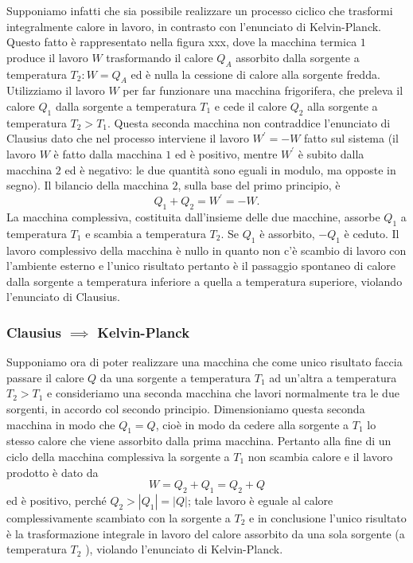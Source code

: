 \documentclass[class=book, crop=false, oneside, 12pt]{standalone}
\begin{document}
Supponiamo infatti che sia possibile realizzare un processo ciclico che trasformi integralmente calore in lavoro, in contrasto con l'enunciato di Kelvin-Planck. 
Questo fatto è rappresentato nella figura xxx, dove la macchina termica \(1\) produce il lavoro \(W\) trasformando il calore \(Q_A\) assorbito dalla sorgente a temperatura \(T_2 : W = Q_A\) ed è nulla la cessione di calore alla sorgente fredda. 
Utilizziamo il lavoro \(W\) per far funzionare una macchina frigorifera, che preleva il calore \(Q_1\) dalla sorgente a temperatura \(T_1\) e cede il calore \(Q_2\) alla sorgente a temperatura \(T_2>T_1\). 
Questa seconda macchina non contraddice l'enunciato di Clausius dato che nel processo interviene il lavoro \(W^{\prime} = -W\) fatto sul sistema (il lavoro \(W\) è fatto dalla macchina \(1\) ed è positivo, mentre \(W^{\prime}\) è subito dalla macchina \(2\) ed è negativo: 
le due quantità sono eguali in modulo, ma opposte in segno). 
Il bilancio della macchina \(2\), sulla base del primo principio, è 
\begin{equation*}
    Q_1 + Q_2 = W^{\prime} = - W.
\end{equation*}
La macchina complessiva, costituita dall'insieme delle due macchine, assorbe \(Q_1\) a temperatura \(T_1\) e scambia a temperatura \(T_2\). 
Se \(Q_1\) è assorbito, \(-Q_1\) è ceduto. 
Il lavoro complessivo della macchina è nullo in quanto non c'è scambio di lavoro con l'ambiente esterno e l'unico risultato pertanto è il passaggio spontaneo di calore dalla sorgente a temperatura inferiore a quella a temperatura superiore, violando l'enunciato di Clausius.

\subsubsection*{Clausius \(\implies\) Kelvin-Planck}

Supponiamo ora di poter realizzare una macchina che come unico risultato faccia passare il calore \(Q\) da una sorgente a temperatura \(T_1\) ad un'altra a temperatura \(T_2 > T_1\) e consideriamo una seconda macchina che lavori normalmente tra le due sorgenti, in accordo col secondo principio. 
Dimensioniamo questa seconda macchina in modo che \( Q_1 = Q\), cioè in modo da cedere alla sorgente a \(T_1\) lo stesso calore che viene assorbito dalla prima macchina.
Pertanto alla fine di un ciclo della macchina complessiva la sorgente a \(T_1\) non scambia calore e il lavoro prodotto è dato da 
\begin{equation*}
    W = Q_2 + Q_1 = Q_2 + Q
\end{equation*}
ed è positivo, perché \(Q_2 > |Q_1| = |Q| \); tale lavoro è eguale al calore complessivamente scambiato con la sorgente a \(T_2\) e in conclusione l'unico risultato è la trasformazione integrale in lavoro del calore assorbito da una sola sorgente (a temperatura \(T_2\) ), violando l'enunciato di Kelvin-Planck.
\end{document}
